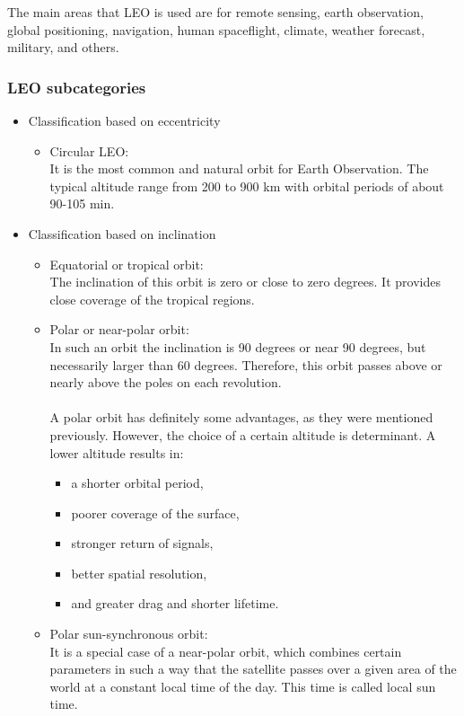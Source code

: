The main areas that LEO is used are for remote sensing, earth observation, global positioning, navigation, human spaceflight, climate, weather forecast, military, and others. 

\pagebreak
\subsubsection{LEO subcategories}
\bigskip

\begin{itemize}
\item Classification based on eccentricity
	\begin{itemize}
	\item Circular LEO: \\
	It is the most common and natural orbit for Earth Observation. The typical altitude range from 200 to 900 km with orbital periods of about 90-105 min.
	\end{itemize}
\item Classification based on inclination
	\begin{itemize}
	\item Equatorial or tropical orbit: \\
	The inclination of this orbit is zero or close to zero degrees. It provides close coverage of the tropical regions.
	\item Polar or near-polar orbit: \\
	In such an orbit the inclination is 90 degrees or near 90 degrees, but necessarily larger than 60 degrees. Therefore, this orbit passes above or nearly above the poles on each revolution. \\ %
	\\
	A polar orbit has definitely some advantages, as they were mentioned previously. However, the choice of a certain altitude is determinant. A lower altitude results in:
		\begin{itemize}
		\item a shorter orbital period,
		\item poorer coverage of the surface,
		\item stronger return of signals,
		\item better spatial resolution,
		\item and greater drag and shorter lifetime.
		\end{itemize}
	\item Polar sun-synchronous orbit: \\
	It is a special case of a near-polar orbit, which combines certain parameters in such a way that the satellite passes over a given area of the world at a constant local time of the day. This time is called local sun time.
	

\end{itemize}
\end{itemize}
